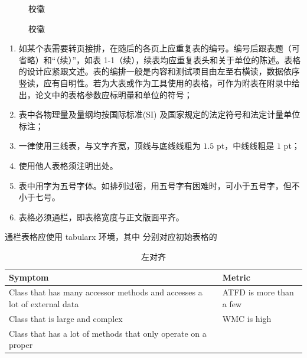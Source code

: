 \begin{texcodeonly}[]{}
  \begin{figure}[H]
    \subfigXJTUred    \subfigXJTUblue
    \subfigXJTUblue   \subfsubfigXJTUredigg
    \subfigXJTUred    \subfigXJTUblue
    \caption{校徽}
  \end{figure}
\end{texcodeonly}

\begin{figure}[H]
  \subfigXJTUred    \subfigXJTUblue
  \subfigXJTUblue   \subfigXJTUred
  \subfigXJTUred    \subfigXJTUblue
  \caption{校徽}
\end{figure}

\clearpage


\begin{tcolorbox}[colback=red!5!white,colframe=red!75!black]
  \begin{enumerate}[leftmargin=0.5cm]
    \item 如某个表需要转页接排，在随后的各页上应重复表的编号。编号后跟表题（可省略）和“（续）”，如表 1-1（续），续表均应重复表头和关于单位的陈述。表格的设计应紧跟文述。表的编排一般是内容和测试项目由左至右横读，数据依序竖读，应有自明性。若为大表或作为工具使用的表格，可作为附表在附录中给出，论文中的表格参数应标明量和单位的符号；
    \item 表中各物理量及量纲均按国际标准(SI) 及国家规定的法定符号和法定计量单位标注；
    \item 一律使用三线表，与文字齐宽，顶线与底线线粗为 $1.5$ pt，中线线粗是 $1$ pt；
    \item 使用他人表格须注明出处。
    \item 表中用字为五号字体。如排列过密，用五号字有困难时，可小于五号字，但不小于七号。
    \item 表格必须通栏，即表格宽度与正文版面平齐。
  \end{enumerate}
\end{tcolorbox}




通栏表格应使用 tabularx 环境，其中  分别对应初始表格的 

\begin{texcode}[]{}
  \begin{table}[H]
    \caption{左对齐}
    \begin{tabularx}{\textwidth}{XX}
    \toprule
        \textbf{Symptom} & \textbf{Metric} \\
    \midrule
        Class that has many accessor methods and accesses a lot of external data & ATFD is more than a few\\
        Class that is large and complex & WMC is high \\
        Class that has a lot of methods that only operate on a proper & \\
    \bottomrule
    \end{tabularx}
  \end{table}
\end{texcode}

